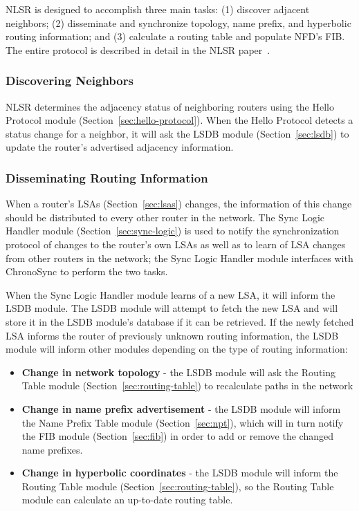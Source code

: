 NLSR is designed to accomplish three main tasks: (1) discover adjacent
neighbors; (2) disseminate and synchronize topology, name prefix, and
hyperbolic routing information; and (3) calculate a routing table and
populate NFD's FIB.  The entire protocol is described in detail in the
NLSR paper~\cite{NlsrTr}.

\subsubsection{Discovering Neighbors}

NLSR determines the adjacency status of neighboring routers using the Hello Protocol module (Section~\ref{sec:hello-protocol}).
When the Hello Protocol detects a status change for a neighbor, it will ask the LSDB module (Section~\ref{sec:lsdb}) to update the router's advertised adjacency information.

\subsubsection{Disseminating Routing Information}

When a router's LSAs (Section~\ref{sec:lsas}) changes, the information of this change should be distributed to every other router in the network.
The Sync Logic Handler module (Section~\ref{sec:sync-logic}) is used to notify the synchronization protocol of changes to the router's own LSAs as well as to learn of LSA changes from other routers in the network;
the Sync Logic Handler module interfaces with ChronoSync to perform the two tasks.

When the Sync Logic Handler module learns of a new LSA, it will inform the LSDB module.
The LSDB module will attempt to fetch the new LSA and will store it in the LSDB module's database if it can be retrieved.
If the newly fetched LSA informs the router of previously unknown routing information, the LSDB module will inform other modules depending on the type of routing information:
\begin{itemize}
  \item \textbf{Change in network topology} - the LSDB module will ask the Routing Table module (Section~\ref{sec:routing-table}) to recalculate paths in the network
\item \textbf{Change in name prefix advertisement} - the LSDB module will inform the Name Prefix Table module (Section~\ref{sec:npt}), which will in turn notify the FIB module (Section~\ref{sec:fib}) in order to add or remove the changed name prefixes.
\item \textbf{Change in hyperbolic coordinates} - the LSDB module will inform the Routing Table module (Section~\ref{sec:routing-table}), so the Routing Table module can calculate an up-to-date routing table.
\end{itemize}

